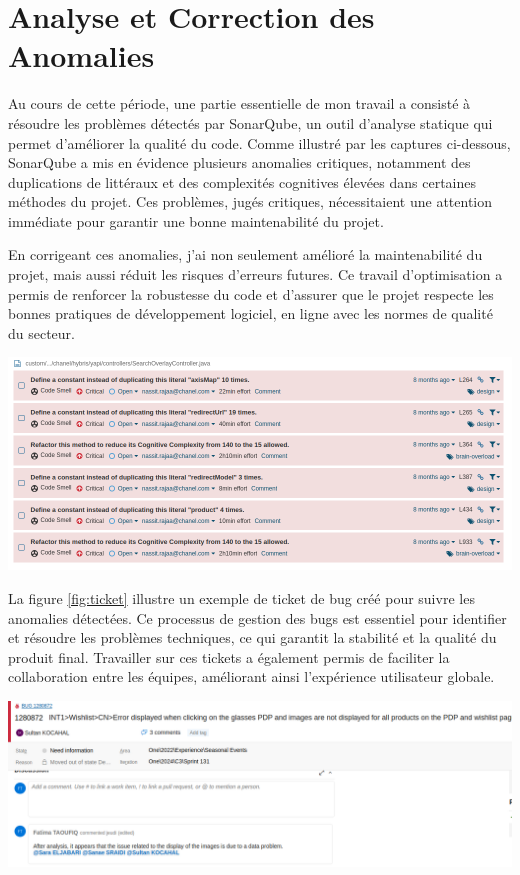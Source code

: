 \section{Analyse et Correction des Anomalies}

Au cours de cette période, une partie essentielle de mon travail a consisté à résoudre les problèmes détectés par SonarQube, un outil d'analyse statique qui permet d'améliorer la qualité du code. Comme illustré par les captures ci-dessous, SonarQube a mis en évidence plusieurs anomalies critiques, notamment des  duplications de littéraux  et des  complexités cognitives  élevées dans certaines méthodes du projet. Ces problèmes, jugés critiques, nécessitaient une attention immédiate pour garantir une bonne maintenabilité du projet.

En corrigeant ces anomalies, j'ai non seulement amélioré la maintenabilité du projet, mais aussi réduit les risques d'erreurs futures. Ce travail d'optimisation a permis de renforcer la  robustesse  du code et d'assurer que le projet respecte les bonnes pratiques de développement logiciel, en ligne avec les normes de qualité du secteur.
\begin{center}
    \centering
    \includegraphics[width=19cm]{Figures/Screens/bug.png}
    \label{fig:corr}
\end{center}
La figure \ref{fig:ticket} illustre un exemple de ticket de bug  créé pour suivre les anomalies détectées. Ce processus de gestion des bugs est essentiel pour identifier et résoudre les problèmes techniques, ce qui garantit la  stabilité  et la  qualité  du produit final. Travailler sur ces tickets a également permis de faciliter la collaboration entre les équipes, améliorant ainsi l'expérience utilisateur globale.
\begin{center}
    \centering
    \includegraphics[width=19cm]{Figures/Screens/ticket.png}
    \label{fig:ticket}
\end{center}
